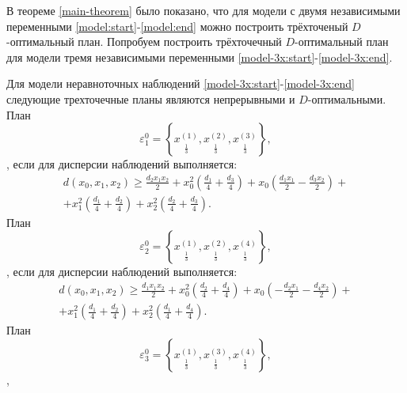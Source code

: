 	В теореме \ref{main-theorem} было показано, что для модели с двумя независимыми переменными \eqref{model:start}-\eqref{model:end} можно построить трёхточеный $D$-оптимальный план.  
	Попробуем построить трёхточечный $D$-оптимальный план для модели тремя независимыми переменными  \eqref{model-3x:start}-\eqref{model-3x:end}.
	\begin{theorem}\label{theorem:model-3x-D-opt}
		Для модели неравноточных наблюдений \eqref{model-3x:start}-\eqref{model-3x:end} следующие трехточечные планы являются непрерывными и $D$-оптимальными.\\
		План 
		\begin{equation} \label{theorem:model-3x-D-opt:plan-1}
			\varepsilon_1^{0} = \left \{ 
				\underset{\frac 1 3} {x^{(1)}},
				\underset{\frac 1 3} {x^{(2)}},
				\underset{\frac 1 3} {x^{(3)}}
			\right \},
		\end{equation},
		если для дисперсии наблюдений выполняется:
		\begin{multline}\label{theorem:model-3x-D-opt:plan-1-d}
			d(x_0, x_1, x_2) \ge \frac{d_{2} x_{1} x_{2}}{2} + x_{0}^{2} \left(\frac{d_{1}}{4} + \frac{d_{3}}{4}\right) + x_{0} \left(\frac{d_{1} x_{1}}{2} - \frac{d_{3} x_{2}}{2}\right) + \\ + x_{1}^{2} \left(\frac{d_{1}}{4} + \frac{d_{2}}{4}\right) + x_{2}^{2} \left(\frac{d_{2}}{4} + \frac{d_{3}}{4}\right).
		\end{multline}
		План 
		\begin{equation} \label{theorem:model-3x-D-opt:plan-2}
			\varepsilon_2^{0} = \left \{ 
				\underset{\frac 1 3} {x^{(1)}},
				\underset{\frac 1 3} {x^{(2)}},
				\underset{\frac 1 3} {x^{(4)}}
			\right \},
		\end{equation},
		если для дисперсии наблюдений выполняется:
		\begin{multline}\label{theorem:model-3x-D-opt:plan-2-d}
			d(x_0, x_1, x_2) \ge \frac{d_{1} x_{1} x_{2}}{2} + x_{0}^{2} \left(\frac{d_{2}}{4} + \frac{d_{4}}{4}\right) + x_{0} \left(- \frac{d_{2} x_{1}}{2} - \frac{d_{4} x_{2}}{2}\right) + \\ + x_{1}^{2} \left(\frac{d_{1}}{4} + \frac{d_{2}}{4}\right) + x_{2}^{2} \left(\frac{d_{1}}{4} + \frac{d_{4}}{4}\right).
		\end{multline}
		План 
		\begin{equation} \label{theorem:model-3x-D-opt:plan-3}
			\varepsilon_3^{0} = \left \{ 
				\underset{\frac 1 3} {x^{(1)}},
				\underset{\frac 1 3} {x^{(3)}},
				\underset{\frac 1 3} {x^{(4)}}
			\right \},
		\end{equation},

\end{theorem}
